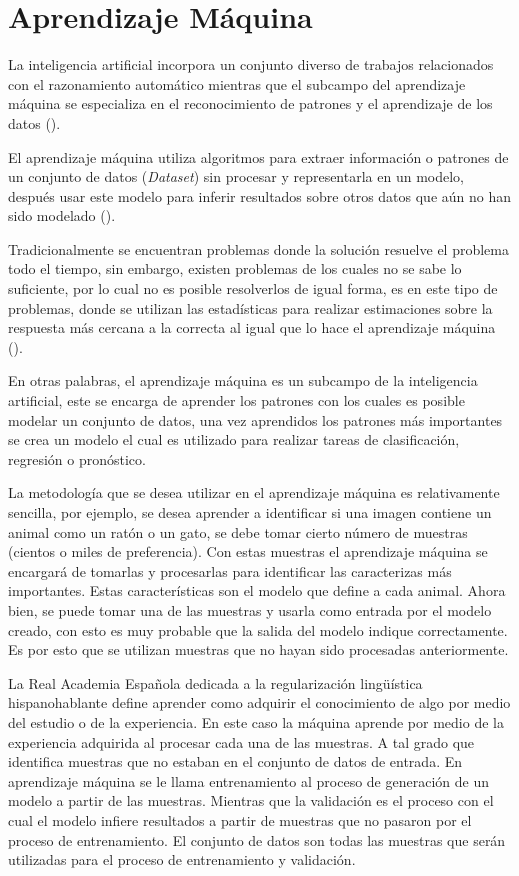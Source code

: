 \section{Aprendizaje Máquina}
\label{sec:MachineLearning}

La inteligencia artificial incorpora un conjunto diverso de trabajos relacionados con el razonamiento automático mientras que el subcampo del aprendizaje máquina se especializa en el reconocimiento de patrones y el aprendizaje de los datos (\cite{rosebrock2017deep}).

El aprendizaje máquina utiliza algoritmos para extraer información o patrones de un conjunto de datos (\textit{Dataset}) sin procesar y representarla en un modelo, después usar este modelo para inferir resultados sobre otros datos que aún no han sido modelado (\cite{patterson2017deep}).


Tradicionalmente se encuentran problemas donde la solución resuelve el problema todo el tiempo, sin embargo, existen problemas de los cuales no se sabe lo suficiente, por lo cual no es posible resolverlos de igual forma, es en este tipo de problemas, donde se utilizan las estadísticas para realizar estimaciones sobre la respuesta más cercana a la correcta al igual que lo hace el aprendizaje máquina (\cite{harrington2012Machine}).


En otras palabras, el aprendizaje máquina es un subcampo de la inteligencia artificial, este se encarga de aprender los patrones con los cuales es posible modelar un conjunto de datos, una vez aprendidos los patrones más importantes se crea un modelo el cual es utilizado para realizar tareas de clasificación, regresión o pronóstico.

La metodología que se desea utilizar en el aprendizaje máquina es relativamente sencilla, por ejemplo, se desea aprender a identificar si una imagen contiene un animal como un ratón o un gato, se debe tomar cierto número de muestras (cientos o miles de preferencia). Con estas muestras el aprendizaje máquina se encargará de tomarlas y procesarlas para identificar las caracterizas más importantes. Estas características son el modelo que define a cada animal. Ahora bien, se puede tomar una de las muestras y usarla como entrada por el modelo creado, con esto es muy probable que la salida del modelo indique correctamente. Es por esto que se utilizan muestras que no hayan sido procesadas anteriormente.

La Real Academia Española dedicada a la regularización lingüística  hispanohablante define aprender como adquirir el conocimiento de algo por medio del estudio o de la experiencia. En este caso la máquina aprende por medio de la experiencia adquirida al procesar cada una de las muestras. A tal grado que identifica muestras que no estaban en el conjunto de datos de entrada. En aprendizaje máquina se le llama entrenamiento al proceso de generación de un modelo a partir de las muestras. Mientras que la validación es el proceso con el cual el modelo infiere resultados a partir de muestras que no pasaron por el proceso de entrenamiento. El conjunto de datos son todas las muestras que serán utilizadas para el proceso de entrenamiento y validación.

